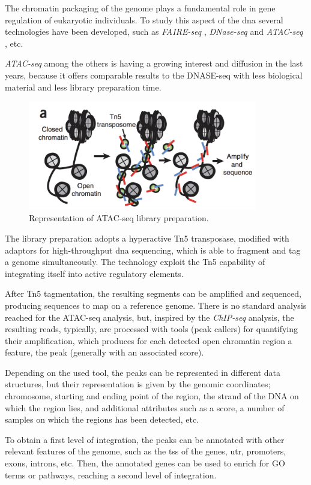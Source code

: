 The chromatin packaging of the genome plays a fundamental role in gene regulation of eukaryotic individuals.
To study this aspect of the \gls{dna} several technologies have been developed, such as \textit{FAIRE-seq} \cite{Giresi2007}, \textit{DNase-seq} \cite{Winter2013} and \textit{ATAC-seq} \cite{Buenrostro2013}, etc.

\textit{ATAC-seq} among the others is having a growing interest and diffusion in the last years, because it offers comparable results to the DNASE-seq with less biological material and less library preparation time.

\begin{figure}[h]
\centering
\includegraphics[width=10cm,keepaspectratio]{img/intro/atac.png}
\caption[ATAC-seq experiment]{Representation of ATAC-seq library preparation. \cite{Buenrostro2013}}
\label{fig:atacseqexp}
\end{figure}

The library preparation adopts a hyperactive Tn5 transposase, modified with adaptors for high-throughput  \gls{dna} sequencing, which is able to fragment and tag a genome simultaneously.
The technology exploit the Tn5 capability of integrating itself into active regulatory elements.

After Tn5 tagmentation, the resulting segments can be amplified and sequenced, producing sequences to map on a reference genome.
There is no standard analysis reached for the ATAC-seq analysis, but, inspired by the \textit{ChIP-seq} analysis, the resulting reads, typically, are processed with tools (peak callers) for quantifying their amplification, which produces for each detected open chromatin region a feature, the peak (generally with an associated score). 

Depending on the used tool, the peaks can be represented in different data structures, but their representation is given by the genomic coordinates; chromosome, starting and ending point of the region, the strand of the DNA on which the region lies, and additional attributes such as a score, a number of samples on which the regions has been detected, etc.

To obtain a first level of integration, the peaks can be annotated with other relevant features of the genome, such as the \gls{tss} of the genes, \gls{utr}, promoters, exons, introns, etc.  
Then, the annotated genes can be used to enrich for GO terms or pathways, reaching a second level of integration.




